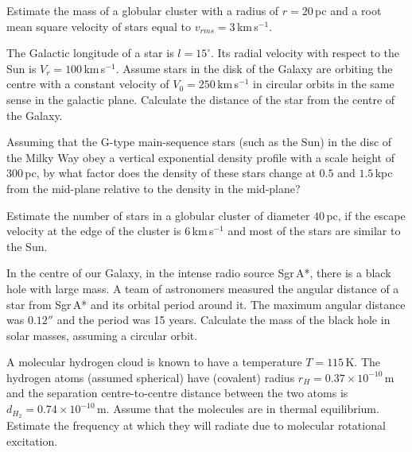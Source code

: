 Estimate the mass of a globular cluster with a radius of $r = 20$\,pc and a root
mean square velocity of stars equal to $v_{rms} = 3$\,km\,s$^{-1}$.

The Galactic longitude of a star is $l = 15^\circ$. Its radial velocity with
respect to the Sun is $V_r = 100$\,km\,s$^{-1}$. Assume stars in the disk of the
Galaxy are orbiting the centre with a constant velocity of
$V_0 = 250$\,km\,s$^{-1}$ in circular orbits in the same sense in the galactic
plane. Calculate the distance of the star from the centre of the Galaxy.

Assuming that the G-type main-sequence stars (such as the Sun) in the disc of the
Milky Way obey a vertical exponential density profile with a scale height of
$300$\,pc, by what factor does the density of these stars change at $0.5$ and
$1.5$\,kpc from the mid-plane relative to the density in the mid-plane?

Estimate the number of stars in a globular cluster of diameter $40$\,pc, if the
escape velocity at the edge of the cluster is $6$\,km\,s$^{-1}$ and most of the
stars are similar to the Sun.

In the centre of our Galaxy, in the intense radio source Sgr\,A*, there is a
black hole with large mass. A team of astronomers measured the angular distance
of a star from Sgr\,A* and its orbital period around it. The maximum angular
distance was $0.12''$ and the period was 15 years. Calculate the mass of the
black hole in solar masses, assuming a circular orbit.

A molecular hydrogen cloud is known to have a temperature $T = 115$\,K. The
hydrogen atoms (assumed spherical) have (covalent) radius
$r_H = 0.37 \times 10^{-10}$\,m and the separation centre-to-centre distance
between the two atoms is $d_{H_2} = 0.74 \times 10^{-10}$\,m. Assume that the
molecules are in thermal equilibrium. Estimate the frequency at which they will
radiate due to molecular rotational excitation.

